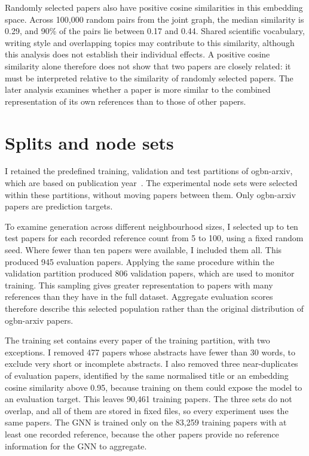 Randomly selected papers also have positive cosine similarities in this embedding space. Across 100,000 random pairs from the joint graph, the median similarity is 0.29, and 90\% of the pairs lie between 0.17 and 0.44. Shared scientific vocabulary, writing style and overlapping topics may contribute to this similarity, although this analysis does not establish their individual effects. A positive cosine similarity alone therefore does not show that two papers are closely related: it must be interpreted relative to the similarity of randomly selected papers. The later analysis examines whether a paper is more similar to the combined representation of its own references than to those of other papers.

\section{Splits and node sets}
\label{sec:splits}

I retained the predefined training, validation and test partitions of ogbn-arxiv, which are based on publication year~\cite{hu2020open}. The experimental node sets were selected within these partitions, without moving papers between them. Only ogbn-arxiv papers are prediction targets.

To examine generation across different neighbourhood sizes, I selected up to ten test papers for each recorded reference count from 5 to 100, using a fixed random seed. Where fewer than ten papers were available, I included them all. This produced 945 evaluation papers. Applying the same procedure within the validation partition produced 806 validation papers, which are used to monitor training. This sampling gives greater representation to papers with many references than they have in the full dataset. Aggregate evaluation scores therefore describe this selected population rather than the original distribution of ogbn-arxiv papers.

The training set contains every paper of the training partition, with two exceptions. I removed 477 papers whose abstracts have fewer than 30 words, to exclude very short or incomplete abstracts. I also removed three near-duplicates of evaluation papers, identified by the same normalised title or an embedding cosine similarity above 0.95, because training on them could expose the model to an evaluation target. This leaves 90,461 training papers. The three sets do not overlap, and all of them are stored in fixed files, so every experiment uses the same papers. The GNN is trained only on the 83,259 training papers with at least one recorded reference, because the other papers provide no reference information for the GNN to aggregate.

